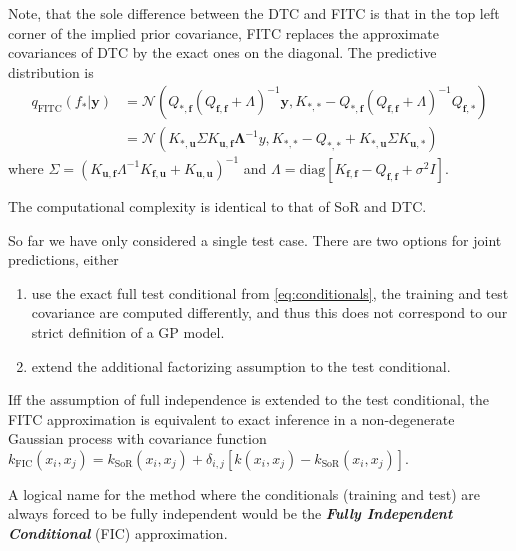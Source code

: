 \documentclass[10pt]{elegantbook}
\newcommand{\mydefination}[1]{\textbf{\textit{\textcolor{structurecolor}{#1}}}}
\begin{document}
Note, that the sole difference between the DTC and FITC is that in the top left corner of the implied
prior covariance, FITC replaces the approximate covariances of DTC by the exact ones on the
diagonal. The predictive distribution is
\begin{equation}
    \begin{aligned}
    q_{\text{FITC}}(f_* | \mathbf y) &= \mathcal N \left (
        Q_{*, \mathbf f} (Q_{\mathbf f, \mathbf f} + \Lambda)^{-1} \mathbf y,
        K_{*, *} - Q_{*, \mathbf f} (Q_{\mathbf f, \mathbf f} + \Lambda)^{-1} Q_{\mathbf f, *}
        \right ) \\
        &= \mathcal N \left (
            K_{*, \mathbf u} \Sigma K_{\mathbf u, \mathbf f} \mathbf \Lambda^{-1} y,
            K_{*, *} - Q_{*, *} + K_{*, \mathbf u} \Sigma K_{\mathbf u, *}
            \right )
    \end{aligned}
\end{equation}
where $\Sigma = (K_{\mathbf u, \mathbf f} \Lambda^{-1} K_{\mathbf f, \mathbf u} + K_{\mathbf u, \mathbf u})^{-1}$ and 
$\Lambda = \mathrm{diag} [K_{\mathbf f, \mathbf f} - Q_{\mathbf f, \mathbf f} + \sigma^2 I]$.

The computational complexity is identical to that of SoR and DTC.

So far we have only considered a single test case. There are two options for joint predictions,
either 
\begin{enumerate}
    \item use the exact full test conditional from \ref{eq:conditionals}, the training and test covariance are
computed differently, and thus this does not correspond to our strict definition of a GP model.
    \item extend the additional factorizing assumption to the test conditional.
\end{enumerate}

\begin{remark}
    Iff the assumption of full independence is extended to the test conditional, the FITC approximation is equivalent to exact inference in a non-degenerate Gaussian process with covariance
function $k_{\mathrm{FIC}}(x_{i},x_{j})=k_{\mathrm{SoR}}(x_{i},x_{j})+\delta_{i,j}[k(x_{i},x_{j})-k_{\mathrm{SoR}}(x_{i},x_{j})]$.
\end{remark}

A logical name for the method where the conditionals (training and
test) are always forced to be fully independent would be the \mydefination{Fully Independent Conditional} (FIC)
approximation.
\end{document}
